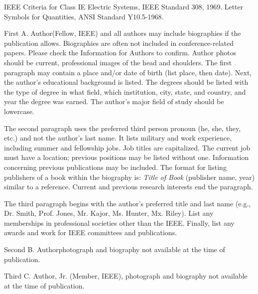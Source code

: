 \documentclass{IEEEtaes}
\begin{document}
\vspace*{-12pt}
\begin{thebibliography}{[31d]}
\setcounter{enumiv}{23}

IEEE Criteria for Class IE Electric Systems, IEEE Standard 308, 1969.
Letter Symbols for Quantities, ANSI Standard Y10.5-1968.
\end{thebibliography}


\biographysection

\begin{IEEEbiography}{First A. Author}{\space}(Fellow, IEEE) and all authors may include biographies if the publication allows. Biographies are often not included in conference-related papers. Please check the Information for Authors to confirm. Author photos should be current, professional images of the head and shoulders. The first paragraph may contain a place and/or date of birth (list place, then date). Next, the author's educational background is listed. The degrees should be listed with the type of degree in what field, which institution, city, state, and country, and year the degree was earned. The author's major field of study should be lowercase.

The second paragraph uses the preferred third person pronoun (he, she, they, etc.) and not the author's last name. It lists military and work experience, including summer and fellowship jobs. Job titles are capitalized. The current job must have a location; previous positions may be listed without one. Information concerning previous publications may be included. The format for listing publishers of a book within the biography is: \emph{Title of Book} (publisher name, year) similar to a reference. Current and previous research interests end the paragraph.

The third paragraph begins with the author's preferred title and last name (e.g., Dr. Smith, Prof. Jones, Mr. Kajor, Ms. Hunter, Mx. Riley). List any memberships in professional societies other than the IEEE. Finally, list any awards and work for IEEE committees and publications.
\end{IEEEbiography}

\begin{IEEEbiography}{Second B. Author}{\space}photograph and biography not available at the time of publication.
\end{IEEEbiography}

\begin{IEEEbiography}{Third C. Author, Jr.} (Member, IEEE), photograph and biography not available at the time of publication.
\end{IEEEbiography}
\end{document}
